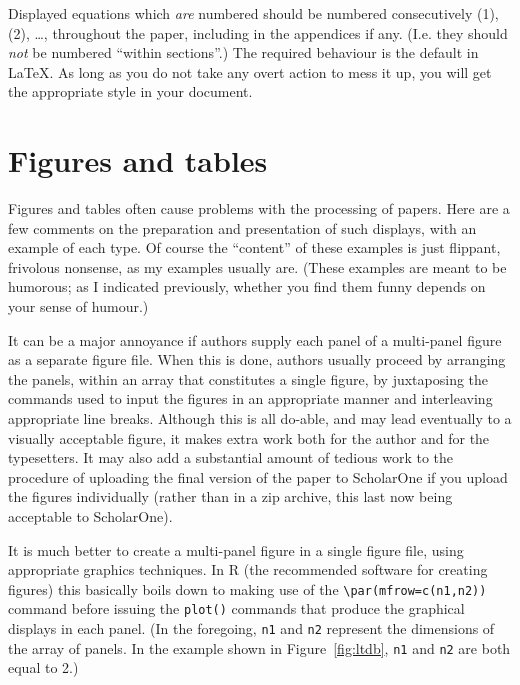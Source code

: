 \documentclass[times, doublespace]{anzsauth}
\begin{document}
\noindent
Displayed equations which \emph{are} numbered should be numbered
consecutively (1), (2), \ldots, throughout the paper, including
in the appendices if any.  (I.e. they should \emph{not} be numbered
``within sections''.)  The required behaviour is the default in
\LaTeX.  As long as you do not take any overt action to mess it up,
you will get the appropriate style in your document.

\section{Figures and tables}
\label{sec:figAndTab}

Figures and tables often cause problems with the processing
of papers.  Here are a few comments on the preparation and
presentation of such displays, with an example of each type.
Of course the ``content'' of these examples is just flippant,
frivolous nonsense, as my examples usually are.  (These examples
are meant to be humorous; as I indicated previously, whether you
find them funny depends on your sense of humour.)

It can be a major annoyance if authors supply each panel of a
multi-panel figure as a separate figure file.  When this is done,
authors usually proceed by arranging the panels, within an array
that constitutes a single figure, by juxtaposing the commands used
to input the figures in an appropriate manner and interleaving
appropriate line breaks.  Although this is all do-able, and may
lead eventually to a visually acceptable figure, it makes extra
work both for the author and for the typesetters.  It may also add a
substantial amount of tedious work to the procedure of uploading
the final version of the paper to ScholarOne if you upload the
figures individually (rather than in a zip archive, this last
now being acceptable to ScholarOne).

It is much better to create a multi-panel figure in a single figure
file, using appropriate graphics techniques.  In \textsf{R} (the
recommended software for creating figures) this basically boils
down to making use of the \verb!\par(mfrow=c(n1,n2))! command
before issuing the \texttt{plot()} commands that produce the
graphical displays in each panel.  (In the foregoing, \texttt{n1}
and \texttt{n2} represent the dimensions of the array of panels.
In the example shown in Figure~\ref{fig:ltdb}, \texttt{n1} and
\texttt{n2} are both equal to 2.)
\end{document}
